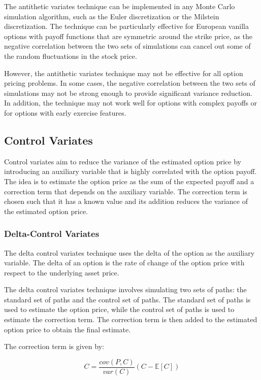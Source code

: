 \documentclass[11pt, a4paper, leqno]{article}
\begin{document}
The antithetic variates technique can be implemented in any Monte Carlo simulation algorithm, such as the Euler discretization or the Milstein discretization. The technique can be particularly effective for European vanilla options with payoff functions that are symmetric around the strike price, as the negative correlation between the two sets of simulations can cancel out some of the random fluctuations in the stock price.

However, the antithetic variates technique may not be effective for all option pricing problems. In some cases, the negative correlation between the two sets of simulations may not be strong enough to provide significant variance reduction. In addition, the technique may not work well for options with complex payoffs or for options with early exercise features.

\subsection{Control Variates}

Control variates aim to reduce the variance of the estimated option price by introducing an auxiliary variable that is highly correlated with the option payoff. The idea is to estimate the option price as the sum of the expected payoff and a correction term that depends on the auxiliary variable. The correction term is chosen such that it has a known value and its addition reduces the variance of the estimated option price.

\subsubsection{Delta-Control Variates}

The delta control variates technique uses the delta of the option as the auxiliary variable. The delta of an option is the rate of change of the option price with respect to the underlying asset price.

The delta control variates technique involves simulating two sets of paths: the standard set of paths and the control set of paths. The standard set of paths is used to estimate the option price, while the control set of paths is used to estimate the correction term. The correction term is then added to the estimated option price to obtain the final estimate.

The correction term is given by:

\begin{equation}
C = \frac{cov(P,C)}{var(C)}(C - \mathbb{E}[C])
\end{equation}
\end{document}

